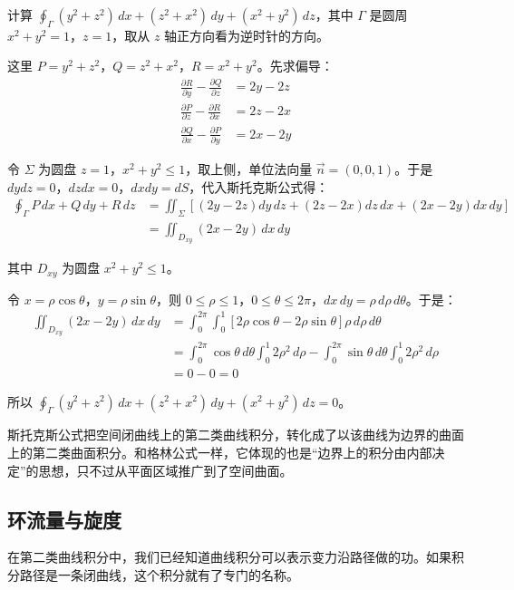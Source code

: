\begin{myexample}
计算 $\oint_{\Gamma} (y^2+z^2)\,dx+(z^2+x^2)\,dy+(x^2+y^2)\,dz$，其中 $\Gamma$ 是圆周 $x^2+y^2=1$，$z=1$，取从 $z$ 轴正方向看为逆时针的方向。

这里 $P=y^2+z^2$，$Q=z^2+x^2$，$R=x^2+y^2$。先求偏导：
\[
\begin{aligned}
\frac{\partial R}{\partial y}-\frac{\partial Q}{\partial z}&=2y-2z\\
\frac{\partial P}{\partial z}-\frac{\partial R}{\partial x}&=2z-2x\\
\frac{\partial Q}{\partial x}-\frac{\partial P}{\partial y}&=2x-2y
\end{aligned}
\]

令 $\Sigma$ 为圆盘 $z=1$，$x^2+y^2\le 1$，取上侧，单位法向量 $\vec{n}=(0,0,1)$。于是\(dydz=0\)，\(dzdx=0\)，\(dxdy=dS\)，代入斯托克斯公式得：
\[
\begin{aligned}
\oint_{\Gamma} P\,dx+Q\,dy+R\,dz
&=
\iint_{\Sigma}
\left[(2y-2z)dy\,dz+(2z-2x)dz\,dx+(2x-2y)dx\,dy\right] \\
&=
\iint_{D_{xy}} (2x-2y)\,dx\,dy
\end{aligned}
\]

其中 $D_{xy}$ 为圆盘 $x^2+y^2\le 1$。

令 $x=\rho\cos\theta$，$y=\rho\sin\theta$，则 $0\le\rho\le 1$，$0\le\theta\le2\pi$，$dx\,dy=\rho\,d\rho\,d\theta$。于是：
\[
\begin{aligned}
\iint_{D_{xy}} (2x-2y)\,dx\,dy
&=
\int_0^{2\pi}\int_0^1
\left[2\rho\cos\theta-2\rho\sin\theta\right]\rho\,d\rho\,d\theta \\
&=
\int_0^{2\pi}\cos\theta\,d\theta\int_0^1 2\rho^2\,d\rho
-\int_0^{2\pi}\sin\theta\,d\theta\int_0^1 2\rho^2\,d\rho \\
&=
0 - 0
= 0
\end{aligned}
\]

所以 $\oint_{\Gamma} (y^2+z^2)\,dx+(z^2+x^2)\,dy+(x^2+y^2)\,dz = 0$。
\end{myexample}

斯托克斯公式把空间闭曲线上的第二类曲线积分，转化成了以该曲线为边界的曲面上的第二类曲面积分。和格林公式一样，它体现的也是“边界上的积分由内部决定”的思想，只不过从平面区域推广到了空间曲面。

\subsection{环流量与旋度}

在第二类曲线积分中，我们已经知道曲线积分可以表示变力沿路径做的功。如果积分路径是一条闭曲线，这个积分就有了专门的名称。


